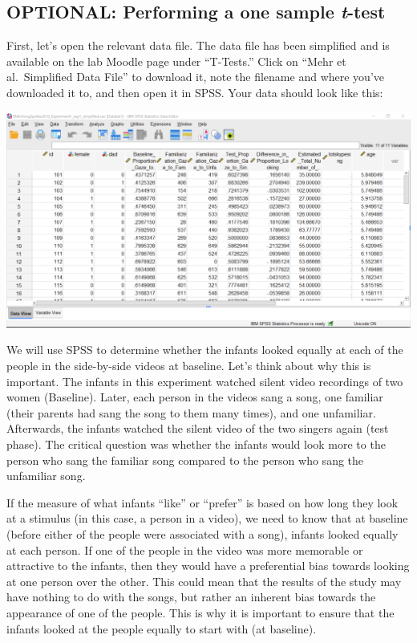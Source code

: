 \documentclass[
]{book}
\begin{document}
\hypertarget{optional-performing-a-one-sample-t-test}{%
\subsection{\texorpdfstring{OPTIONAL: Performing a one sample \emph{t}-test}{OPTIONAL: Performing a one sample t-test}}\label{optional-performing-a-one-sample-t-test}}

First, let's open the relevant data file. The data file has been simplified and is available on the lab Moodle page under ``T-Tests.'' Click on ``Mehr et al.~Simplified Data File'' to download it, note the filename and where you've downloaded it to, and then open it in SPSS. Your data should look like this:

\includegraphics{img/6.4.11.png}

We will use SPSS to determine whether the infants looked equally at each of the people in the side-by-side videos at baseline. Let's think about why this is important. The infants in this experiment watched silent video recordings of two women (Baseline). Later, each person in the videos sang a song, one familiar (their parents had sang the song to them many times), and one unfamiliar. Afterwards, the infants watched the silent video of the two singers again (test phase). The critical question was whether the infants would look more to the person who sang the familiar song compared to the person who sang the unfamiliar song.

If the measure of what infants ``like'' or ``prefer'' is based on how long they look at a stimulus (in this case, a person in a video), we need to know that at baseline (before either of the people were associated with a song), infants looked equally at each person. If one of the people in the video was more memorable or attractive to the infants, then they would have a preferential bias towards looking at one person over the other. This could mean that the results of the study may have nothing to do with the songs, but rather an inherent bias towards the appearance of one of the people. This is why it is important to ensure that the infants looked at the people equally to start with (at baseline).
\end{document}
